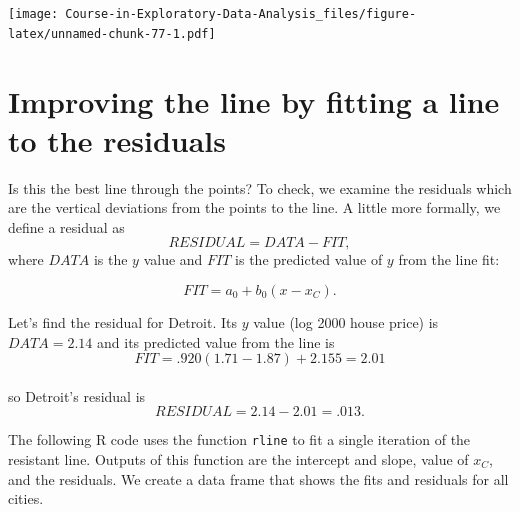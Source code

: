 \documentclass[
]{book}
\newenvironment{Shaded}{\begin{snugshade}}{\end{snugshade}}
\newcommand{\AttributeTok}[1]{\textcolor[rgb]{0.77,0.63,0.00}{#1}}
\newcommand{\FloatTok}[1]{\textcolor[rgb]{0.00,0.00,0.81}{#1}}
\newcommand{\FunctionTok}[1]{\textcolor[rgb]{0.00,0.00,0.00}{#1}}
\newcommand{\NormalTok}[1]{#1}
\newcommand{\OtherTok}[1]{\textcolor[rgb]{0.56,0.35,0.01}{#1}}
\newcommand{\SpecialCharTok}[1]{\textcolor[rgb]{0.00,0.00,0.00}{#1}}
\begin{document}
\texttt{[image: Course-in-Exploratory-Data-Analysis\_files/figure-latex/unnamed-chunk-77-1.pdf]}

\hypertarget{improving-the-line-by-fitting-a-line-to-the-residuals}{%
\section{Improving the line by fitting a line to the residuals}\label{improving-the-line-by-fitting-a-line-to-the-residuals}}

Is this the best line through the points? To check, we examine the residuals which are the vertical deviations from the points to the line. A little more formally, we define a residual as
\[
          RESIDUAL = DATA - FIT,
\]
where \(DATA\) is the \(y\) value and \(FIT\) is the predicted value of \(y\) from the line fit:

\[           
            FIT = a_0 + b_0 (x - x_C).
\]

Let's find the residual for Detroit. Its \(y\) value (log 2000 house price) is \(DATA = 2.14\) and its predicted value from the line is
\[          
          FIT = .920 (1.71 - 1.87) + 2.155 = 2.01
\]\\
so Detroit's residual is
\[ 
          RESIDUAL = 2.14 - 2.01 = .013 .
\]

The following R code uses the function \texttt{rline} to fit a single iteration of the resistant line. Outputs of this function are the intercept and slope, value of \(x_C\), and the residuals. We create
a data frame that shows the fits and residuals for all cities.

\begin{Shaded}
\end{Shaded}
\end{document}
